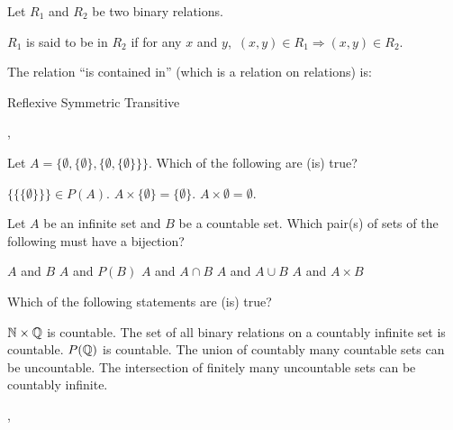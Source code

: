 \begin{questions}

\question Let $R_1$ and $R_2$ be two binary relations. 

$R_1$ is said to be  in $R_2$ if for any $x$ and $y$, $\, (x,y)\in R_1 \Rightarrow (x,y)\in R_2$. 

The relation ``is contained in'' (which is a relation on relations)
is:
\begin{choices}
\choice Reflexive
\choice Symmetric
\choice Transitive
\end{choices}
,
\vspace{1.8in}

\question Let $A = \Big\{\emptyset,\{\emptyset\},\big\{\emptyset,\{\emptyset\} \big\} \Big\}$. Which of the following are (is) true?
\begin{choices}
\choice $\Big\{\big\{\{\emptyset\}\big\}\Big\} \in P(A)$.
\choice $A \times \{\emptyset\} = \{{\emptyset}\}$.
\choice $A \times \emptyset = \emptyset$.
\end{choices}

\vspace{0.2in}


\newpage

\question Let $A$ be an infinite set and $B$ be a countable set. Which pair(s) of sets of the following must have a bijection?
\begin{choices}
\choice $A$ and $B$
\choice $A$ and $P(B)$
\choice $A$ and $A \cap B$
\choice $A$ and $A \cup B$
\choice $A$ and $A \times B$
\end{choices}

\vspace{0.2in}

\vspace{1.8in}


\question Which of the following statements are (is) true?
\begin{choices}
\choice ${\mathbb N}{}\times{\mathbb Q}{}$ is countable.
\choice The set of all binary relations on a countably infinite set is countable.
\choice $P({\mathbb Q}{})$ is countable.
\choice The union of countably many countable sets can be uncountable.
\choice The intersection of finitely many uncountable sets can be countably infinite.
\end{choices}
, 
\end{questions}
